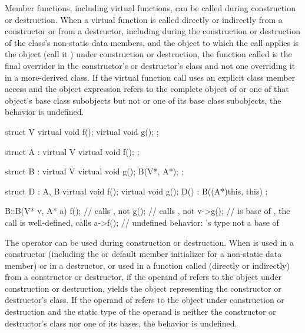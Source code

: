 \pnum
{}%
%
%
%
Member functions, including virtual functions, can be called
during construction or destruction.
When a virtual function is called directly or indirectly from a constructor
or from a destructor,
including during the construction or destruction of the class's non-static data
members,
and the object to which the call applies is the object (call it ) under construction or
destruction,
the function called is the
final overrider in the constructor's or destructor's class and not one
overriding it in a more-derived class.
If the virtual function call uses an explicit class member access
and the object expression refers to
the complete object of  or one of that object's base class subobjects
but not  or one of its base class subobjects, the behavior
is undefined.
\begin{example}
\begin{codeblock}
struct V {
  virtual void f();
  virtual void g();
};

struct A : virtual V {
  virtual void f();
};

struct B : virtual V {
  virtual void g();
  B(V*, A*);
};

struct D : A, B {
  virtual void f();
  virtual void g();
  D() : B((A*)this, this) { }
};

B::B(V* v, A* a) {
  f();              // calls , not 
  g();              // calls , not 
  v->g();           //  is base of , the call is well-defined, calls 
  a->f();           // undefined behavior: 's type not a base of 
}
\end{codeblock}
\end{example}

\pnum
{}%
%
%
%
The
operator can be used during construction or destruction.
When
is used in a constructor (including the
 or default member initializer
for a non-static data member)
or in a destructor, or used in a function called (directly or indirectly) from
a constructor or destructor, if the operand of
refers to the object under construction or destruction,
yields the
object representing the constructor or destructor's class.
If the operand of
refers to the object under construction or destruction and the static type of
the operand is neither the constructor or destructor's class nor one of its
bases, the behavior is undefined.

